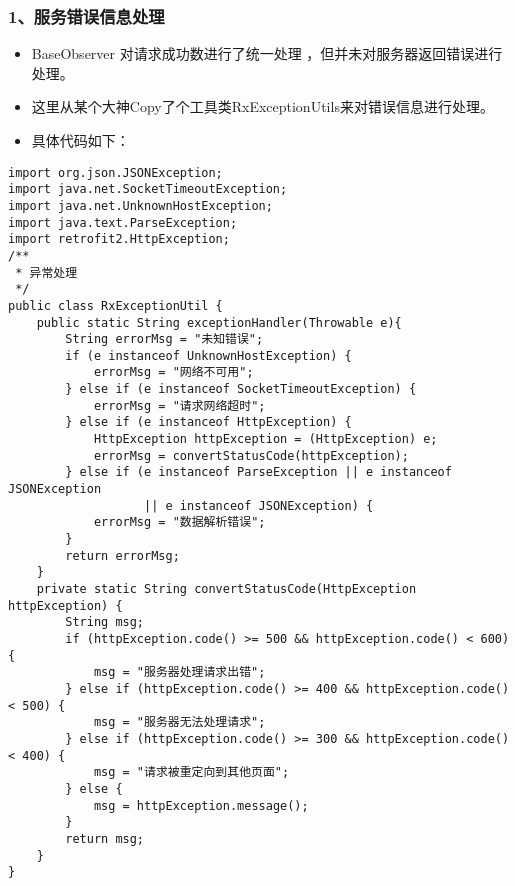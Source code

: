 \documentclass[9pt, b5paper]{article}
\begin{document}
\subsubsection{1、服务错误信息处理}
\label{sec-18-4-1}
\begin{itemize}
\item BaseObserver 对请求成功数进行了统一处理 ，但并未对服务器返回错误进行处理。
\item 这里从某个大神Copy了个工具类RxExceptionUtils来对错误信息进行处理。
\item 具体代码如下：
\end{itemize}
\begin{verbatim}
import org.json.JSONException;
import java.net.SocketTimeoutException;
import java.net.UnknownHostException;
import java.text.ParseException;
import retrofit2.HttpException;
/**
 * 异常处理
 */
public class RxExceptionUtil {
    public static String exceptionHandler(Throwable e){
        String errorMsg = "未知错误";
        if (e instanceof UnknownHostException) {
            errorMsg = "网络不可用";
        } else if (e instanceof SocketTimeoutException) {
            errorMsg = "请求网络超时";
        } else if (e instanceof HttpException) {
            HttpException httpException = (HttpException) e;
            errorMsg = convertStatusCode(httpException);
        } else if (e instanceof ParseException || e instanceof JSONException
                   || e instanceof JSONException) {
            errorMsg = "数据解析错误";
        }
        return errorMsg;
    }
    private static String convertStatusCode(HttpException httpException) {
        String msg;
        if (httpException.code() >= 500 && httpException.code() < 600) {
            msg = "服务器处理请求出错";
        } else if (httpException.code() >= 400 && httpException.code() < 500) {
            msg = "服务器无法处理请求";
        } else if (httpException.code() >= 300 && httpException.code() < 400) {
            msg = "请求被重定向到其他页面";
        } else {
            msg = httpException.message();
        }
        return msg;
    }
}
\end{verbatim}
\end{document}
